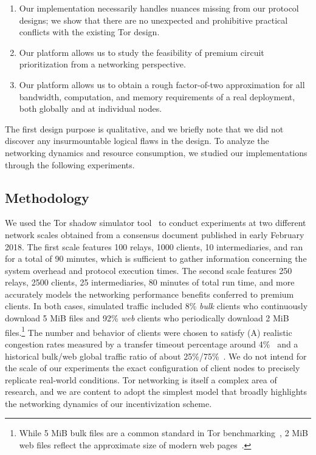 \begin{enumerate}
\item Our implementation necessarily handles nuances missing from our protocol designs; we show that there are no unexpected and prohibitive practical conflicts with the existing Tor design.
\item Our platform allows us to study the feasibility of premium circuit prioritization from a networking perspective.
\item Our platform allows us to obtain a rough factor-of-two approximation for all bandwidth, computation, and memory requirements of a real deployment, both globally and at individual nodes.
\end{enumerate}

The first design purpose is qualitative, and we briefly note that we did not discover any insurmountable logical flaws in the design.
To analyze the networking dynamics and resource consumption, we studied our implementations through the following experiments.

\subsection{Methodology}
\label{subsec:methodology}

We used the Tor shadow simulator tool~\cite{jansen2011shadow, tracey2018high} to conduct experiments at two different network scales obtained from a consensus document published in early February 2018.
The first scale features 100 relays, 1000 clients, 10 intermediaries, and ran for a total of 90 minutes, which is sufficient to gather information concerning the system overhead and protocol execution times.
The second scale features 250 relays, 2500 clients, 25 intermediaries, 80 minutes of total run time, and more accurately models the networking performance benefits conferred to premium clients.
In both cases, simulated traffic included 8\% \emph{bulk} clients who continuously download 5 MiB files and 92\% \emph{web} clients who periodically download 2 MiB files.\footnote{While 5 MiB bulk files are a common standard in Tor benchmarking~\cite{portal2018tormetrics}, 2 MiB web files reflect the approximate size of modern web pages~\cite{team2018httparchive}.}
The number and behavior of clients were chosen to satisfy (A) realistic congestion rates measured by a transfer timeout percentage around 4\%~\cite{portal2018tormetrics} and a historical bulk/web global traffic ratio of about 25\%/75\%~\cite{privcount-ccs2016, learning-ccs2018}.
We do not intend for the scale of our experiments the exact configuration of client nodes to precisely replicate real-world conditions.
Tor networking is itself a complex area of research, and we are content to adopt the simplest model that broadly highlights the networking dynamics of our incentivization scheme.

